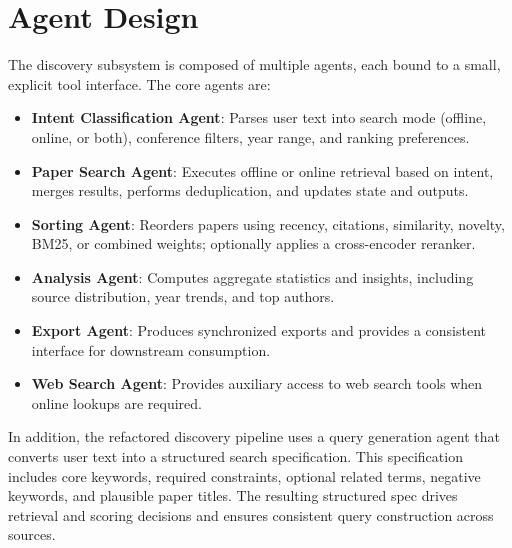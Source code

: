 \section{Agent Design}
The discovery subsystem is composed of multiple agents, each bound to a small, explicit tool interface. The core agents are:
\begin{itemize}
  \item \textbf{Intent Classification Agent}: Parses user text into search mode (offline, online, or both), conference filters, year range, and ranking preferences.
  \item \textbf{Paper Search Agent}: Executes offline or online retrieval based on intent, merges results, performs deduplication, and updates state and outputs.
  \item \textbf{Sorting Agent}: Reorders papers using recency, citations, similarity, novelty, BM25, or combined weights; optionally applies a cross-encoder reranker.
  \item \textbf{Analysis Agent}: Computes aggregate statistics and insights, including source distribution, year trends, and top authors.
  \item \textbf{Export Agent}: Produces synchronized exports and provides a consistent interface for downstream consumption.
  \item \textbf{Web Search Agent}: Provides auxiliary access to web search tools when online lookups are required.
\end{itemize}

In addition, the refactored discovery pipeline uses a query generation agent that converts user text into a structured search specification. This specification includes core keywords, required constraints, optional related terms, negative keywords, and plausible paper titles. The resulting structured spec drives retrieval and scoring decisions and ensures consistent query construction across sources.
